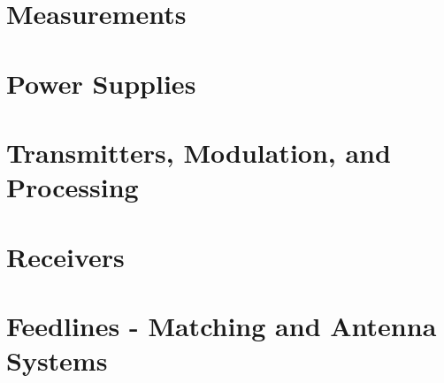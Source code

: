 \documentclass[letterpaper]{article}
\begin{document}
        \newpage

        \section{Measurements}

        \newpage

        \section{Power Supplies}

    \newpage

    \section{Transmitters, Modulation, and Processing}

    \newpage

    \section{Receivers}

    \newpage

    \section{Feedlines - Matching and Antenna Systems}
\end{document}
